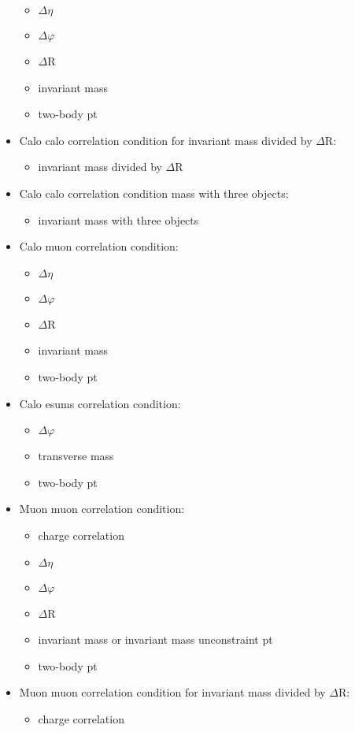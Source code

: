 \begin{itemize}
\begin{itemize}
\item $\Delta\eta$
\item $\Delta\varphi$
\item $\Delta$R
\item invariant mass
\item two-body pt
\end{itemize}
\item Calo calo correlation condition for invariant mass divided by $\Delta$R:
\begin{itemize}
\item invariant mass divided by $\Delta$R
\end{itemize}
\item Calo calo correlation condition mass with three objects:
\begin{itemize}
\item invariant mass with three objects
\end{itemize} 
\item Calo muon correlation condition:
\begin{itemize}
\item $\Delta\eta$
\item $\Delta\varphi$
\item $\Delta$R
\item invariant mass
\item two-body pt
\end{itemize} 
\item Calo esums correlation condition:
\begin{itemize}
\item $\Delta\varphi$
\item transverse mass
\item two-body pt
\end{itemize}
\item Muon muon correlation condition:
\begin{itemize}
\item charge correlation
\item $\Delta\eta$
\item $\Delta\varphi$
\item $\Delta$R
\item invariant mass or invariant mass unconstraint pt
\item two-body pt
\end{itemize}
\item Muon muon correlation condition for invariant mass divided by $\Delta$R:
\begin{itemize}
\item charge correlation

\end{itemize}
\end{itemize}
